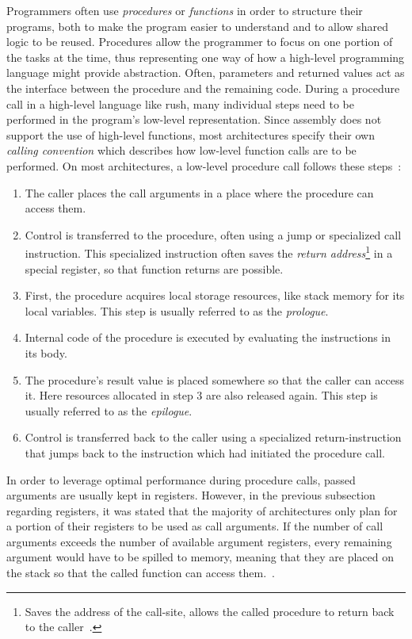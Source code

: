 Programmers often use \emph{procedures} or \emph{functions} in order to structure their programs,
both to make the program easier to understand and to allow shared logic to be reused.
Procedures allow the programmer to focus on one portion of the tasks at the time,
thus representing one way of how a high-level programming language might provide abstraction.
Often, parameters and returned values act as the interface between the procedure and the remaining code.
During a procedure call in a high-level language like rush, many individual steps need to be performed in the program's low-level representation.
Since assembly does not support the use of high-level functions, most architectures specify their own \emph{calling convention} which describes how low-level function calls are to be performed.
On most architectures, a low-level procedure call follows these steps~\cite[p.~98]{Patterson2017-zq}:

\begin{enumerate}
	\item The caller places the call arguments in a place where the procedure can access them.
	\item Control is transferred to the procedure, often using a jump or specialized call instruction.
	      This specialized instruction often saves the \emph{return address}\footnote{Saves the address of the call-site,
		      allows the called procedure to return back to the caller~\cite[p.~99]{Patterson2017-zq}.} in a special register, so that function returns are possible.
	\item First, the procedure acquires local storage resources, like stack memory for its local variables.
	      This step is usually referred to as the \emph{prologue}.
	\item Internal code of the procedure is executed by evaluating the instructions in its body.
	\item The procedure's result value is placed somewhere so that the caller can access it.
	      Here resources allocated in step 3 are also released again.
	      This step is usually referred to as the \emph{epilogue}.
	\item Control is transferred back to the caller using a specialized return-instruction
	      that jumps back to the instruction which had initiated the procedure call.
\end{enumerate}

In order to leverage optimal performance during procedure calls, passed arguments are usually kept in registers.
However, in the previous subsection regarding registers, it was stated that the majority of architectures only plan for a portion of their registers to be used as call arguments.
If the number of call arguments exceeds the number of available argument registers, every remaining argument would have to be spilled to memory,
meaning that they are placed on the stack so that the called function can access them.~\cite[p.~98]{Patterson2017-zq}.

